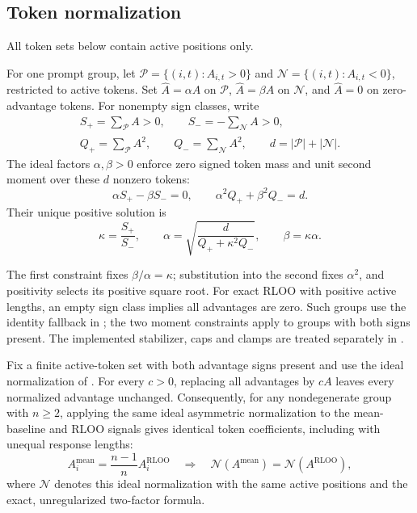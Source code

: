 \subsection{Token normalization}
\label{sec:adaptive-norm}
All token sets below contain active positions only.
\begin{definition}
\label{def:adaptive-norm}
For one prompt group, let $\mathcal P=\{(i,t):A_{i,t}>0\}$ and
$\mathcal N=\{(i,t):A_{i,t}<0\}$, restricted to active tokens.
Set $\hat A=\alpha A$ on $\mathcal P$, $\hat A=\beta A$ on
$\mathcal N$, and $\hat A=0$ on zero-advantage tokens.
For nonempty sign classes, write
\begin{gather*}
 S_+=\sum_{\mathcal P}A>0,\qquad S_-=-\sum_{\mathcal N}A>0,\\
 Q_+=\sum_{\mathcal P}A^2,\qquad Q_-=\sum_{\mathcal N}A^2,\qquad
 d=|\mathcal P|+|\mathcal N|.
\end{gather*}
The ideal factors $\alpha,\beta>0$ enforce zero signed token mass and unit
second moment over these $d$ nonzero tokens:
\[
 \alpha S_+-\beta S_-=0,\qquad \alpha^2Q_++\beta^2Q_-=d.
\]
Their unique positive solution is
\begin{equation}
 \kappa=\frac{S_+}{S_-},\qquad
 \alpha=\sqrt{\frac{d}{Q_++\kappa^2Q_-}},\qquad \beta=\kappa\alpha.
 \label{eq:alpha-beta}
\end{equation}
\end{definition}
The first constraint fixes $\beta/\alpha=\kappa$; substitution into the
second fixes $\alpha^2$, and positivity selects its positive square root.
For exact RLOO with positive active lengths, an empty sign class
implies all advantages are zero. Such groups use the identity fallback
in ; the two moment constraints apply to groups
with both signs present. The implemented stabilizer, caps and clamps are treated
separately in .

\begin{proposition}
\label{prop:normalization-scale-invariance}
Fix a finite active-token set with both advantage signs present and use the
ideal normalization of . For every $c>0$, replacing
all advantages by $cA$ leaves every normalized advantage unchanged.
Consequently, for any nondegenerate group with $n\ge2$, applying the same ideal asymmetric
normalization to the mean-baseline and RLOO signals gives identical token
coefficients, including with unequal response lengths:
\begin{equation}
    A_i^{\mathrm{mean}}=\frac{n-1}{n}A_i^{\mathrm{RLOO}}
    \quad\Longrightarrow\quad
    \mathcal N(A^{\mathrm{mean}})=\mathcal N(A^{\mathrm{RLOO}}),
    \label{eq:normalized-baseline-equivalence}
\end{equation}
where $\mathcal N$ denotes this ideal normalization with the same active
positions and the exact, unregularized two-factor formula.
\end{proposition}


